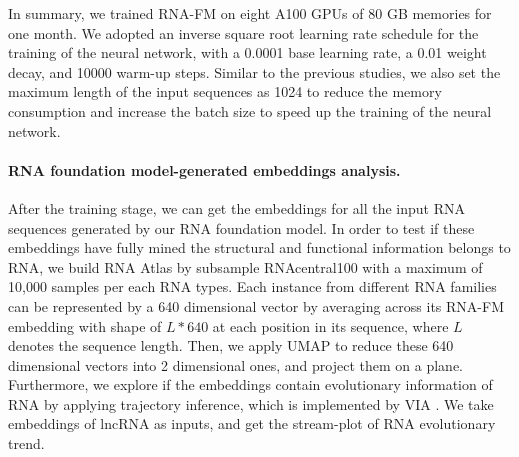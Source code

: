 



In summary, we trained RNA-FM on eight A100 GPUs of 80 GB memories for one month. We adopted an inverse square root learning rate schedule for the training of the neural network, with a 0.0001 base learning rate, a 0.01 weight decay, and 10000 warm-up steps. Similar to the previous studies, we also set the maximum length of the input sequences as 1024 to reduce the memory consumption and increase the batch size to speed up the training of the neural network.

\paragraph{RNA foundation model-generated embeddings analysis.}
After the training stage, we can get the embeddings for all the input RNA sequences generated by our RNA foundation model. In order to test if these embeddings have fully mined the structural and functional information belongs to RNA, we build RNA Atlas by subsample RNAcentral100 with a maximum of 10,000 samples per each RNA types. Each instance from different RNA families can be represented by a 640 dimensional vector by averaging across its RNA-FM embedding with shape of $L*640$ at each position in its sequence, where $L$ denotes the sequence length. Then, we apply UMAP \cite{mcinnes2018umap} to reduce these 640 dimensional vectors into 2 dimensional ones, and project them on a plane. Furthermore, we explore if the embeddings contain evolutionary information of RNA by applying trajectory inference, which is implemented by VIA \cite{stassen2021generalized}. We take embeddings of lncRNA as inputs, and get the stream-plot of RNA evolutionary trend.


